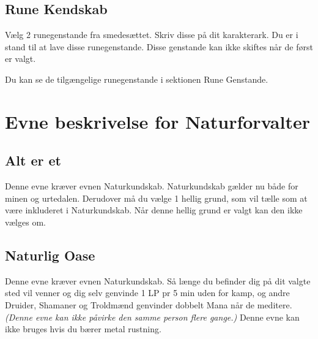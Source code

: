 \subsection*{Rune Kendskab}

Vælg 2 runegenstande fra smedesættet. Skriv disse på dit karakterark. Du er i stand til at lave disse runegenstande. Disse genstande kan ikke skiftes når de først er valgt. 

Du kan se de tilgængelige runegenstande i sektionen Rune Genstande.

\section*{Evne beskrivelse for Naturforvalter}

\subsection*{Alt er et}
Denne evne kræver evnen Naturkundskab. Naturkundskab gælder nu både for minen og urtedalen. Derudover må du vælge 1 hellig grund, som vil tælle som at være inkluderet i Naturkundskab. Når denne hellig grund er valgt kan den ikke vælges om.



\subsection*{Naturlig Oase}
Denne evne kræver evnen Naturkundskab. Så længe du befinder dig på dit valgte sted vil venner og dig selv genvinde 1 LP pr 5 min uden for kamp, og andre Druider, Shamaner og Troldmænd genvinder dobbelt Mana når de meditere. \textit{(Denne evne kan ikke påvirke den samme person flere gange.)} Denne evne kan ikke bruges hvis du bærer metal rustning.


